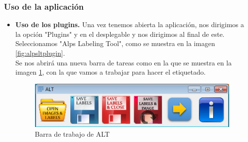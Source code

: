 \subsubsection{Uso de la aplicación}
\begin{itemize}
	\item \textbf{Uso de los plugins.} Una vez tenemos abierta la aplicación, nos dirigimos a la opción "Plugins" y en el desplegable y nos dirigimos al final de este. Seleccionamos "Alps Labeling Tool", como se muestra en la imagen \ref{fig:alpsltplugin}.\\
	
	Se nos abrirá una nueva barra de tareas como en la que se muestra en la imagen \ref{fig:alt}, con la que vamos a trabajar para hacer el etiquetado.
	\begin{figure}
		\centering
		\includegraphics[width=0.7\linewidth]{img/alt}
		\caption{Barra de trabajo de ALT}
		\label{fig:alt}
	\end{figure}
	

\end{itemize}

